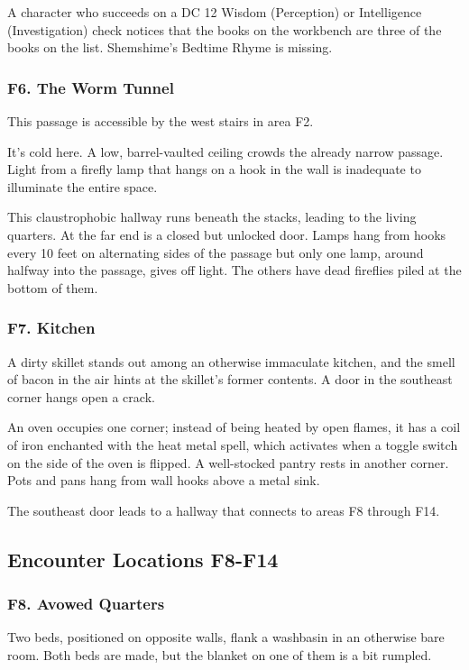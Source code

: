 \documentclass[10pt,a4paper,twoside,bg=print,twocolumn,openany,nodeprecatedcode]{dndbook}
\begin{document}
A character who succeeds on a DC 12 Wisdom (Perception) or Intelligence (Investigation) check notices that the books on the workbench are three of the books on the list. Shemshime's Bedtime Rhyme is missing.

\subsubsection{F6. The Worm Tunnel}
This passage is accessible by the west stairs in area F2.

\begin{DndReadAloud}{}
It's cold here. A low, barrel-vaulted ceiling crowds the already narrow passage. Light from a firefly lamp that hangs on a hook in the wall is inadequate to illuminate the entire space.

\end{DndReadAloud}

This claustrophobic hallway runs beneath the stacks, leading to the living quarters. At the far end is a closed but unlocked door. Lamps hang from hooks every 10 feet on alternating sides of the passage but only one lamp, around halfway into the passage, gives off light. The others have dead fireflies piled at the bottom of them.

\subsubsection{F7. Kitchen}
\begin{DndReadAloud}{}
A dirty skillet stands out among an otherwise immaculate kitchen, and the smell of bacon in the air hints at the skillet's former contents. A door in the southeast corner hangs open a crack.

\end{DndReadAloud}

An oven occupies one corner; instead of being heated by open flames, it has a coil of iron enchanted with the heat metal spell, which activates when a toggle switch on the side of the oven is flipped. A well-stocked pantry rests in another corner. Pots and pans hang from wall hooks above a metal sink.

The southeast door leads to a hallway that connects to areas F8 through F14.

\subsection{Encounter Locations F8-F14}
\subsubsection{F8. Avowed Quarters}
\begin{DndReadAloud}{}
Two beds, positioned on opposite walls, flank a washbasin in an otherwise bare room. Both beds are made, but the blanket on one of them is a bit rumpled.

\end{DndReadAloud}
\end{document}
